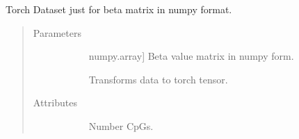 \documentclass[letterpaper,10pt,english]{sphinxmanual}
\begin{document}
\begin{fulllineitems}
\label{\detokenize{index:methylnet.datasets.RawBetaArrayDataSet}}
Torch Dataset just for beta matrix in numpy format.
\begin{quote}\begin{description}
\item[{Parameters}] \leavevmode\begin{description}
\item[{}] \leavevmode{[}numpy.array{]}
Beta value matrix in numpy form.

\item[{}] \leavevmode
Transforms data to torch tensor.

\end{description}

\item[{Attributes}] \leavevmode\begin{description}
\item[{}] \leavevmode
Number CpGs.

\item[{}] \leavevmode
\item[{}] \leavevmode
\end{description}

\end{description}\end{quote}

\end{fulllineitems}

\end{document}
